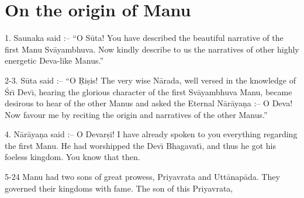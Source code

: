 \chapter{On the origin of Manu}

1. Saunaka said :-- ``O S\=uta! You have described the beautiful narrative of the first Manu Sv\=ayambhuva. Now kindly describe to us the narratives of other highly energetic Deva-like Manus.''

2-3. S\=uta said :-- ``O \d{R}i\d{s}is! The very wise N\=arada, well versed in the knowledge of \'Sr\={\i} Dev\={\i}, hearing the glorious character of the first Sv\=ayambhuva Manu, became desirous to hear of the other Manus and asked the Eternal N\=ar\=aya\d{n}a :-- O Deva! Now favour me by reciting the origin and narratives of the other Manus.''

4. N\=ar\=aya\d{n}a said :-- O Devar\d{s}i! I have already spoken to you everything regarding the first Manu. He had worshipped the Dev\={\i} Bhagavat\={\i}, and thus he got his foeless kingdom. You know that then.

5-24 Manu had two sons of great prowess, Priyavrata and Utt\=anap\=ada. They governed their kingdoms with fame. The son of this Priyavrata,

